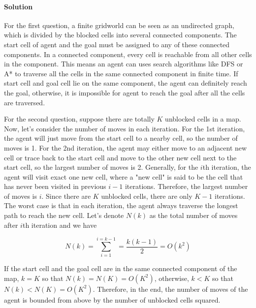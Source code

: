\paragraph{Solution}
For the first question, a finite gridworld can be seen as an undirected graph,
which is divided by the blocked cells into several connected components. The
start cell of agent and the goal must be assigned to any of these connected
components. In a connected component, every cell is reachable from all other
cells in the component. This means an agent can uses search algorithms like DFS
or A* to traverse all the cells in the same connected component in finite time.
If start cell and goal cell lie on the same component, the agent can definitely
reach the goal, otherwise, it is impossible for agent to reach the goal after
all the cells are traversed.

For the second question, suppose there are totally $K$ unblocked cells in a
map. Now, let's consider the number of moves in each iteration. For the 1st
iteration, the agent will just move from the start cell to a nearby cell, so
the number of moves is 1. For the 2nd iteration, the agent may either move to
an adjacent new cell or trace back to the start cell and move to the other new
cell next to the start cell, so the largest number of moves is 2. Generally,
for the $i$th iteration, the agent will visit exact one new cell, where a "new
cell" is said to be the cell that has never been visited in previous $i-1$
iterations. Therefore, the largest number of moves is $i$. Since there are
$K$ unblocked cells, there are only $K-1$ iterations. The worst case is that
in each iteration, the agent always traverse the longest path to reach the new
cell. Let's denote $N(k)$ as the total number of moves after $i$th iteration 
and we have

\begin{equation*}
  N(k)=\sum_{i=1}^{i=k-1}=\frac{k(k-1)}{2}=O(k^2)
\end{equation*}

If the start cell and the goal cell are in the same connected component of the
map, $k=K$ so that $N(k)=N(K)=O(K^2)$, otherwise, $k<K$ so that
$N(k)<N(K)=O(K^2)$.  Therefore, in the end, the number of moves of the agent is
bounded from above by the number of unblocked cells squared.
